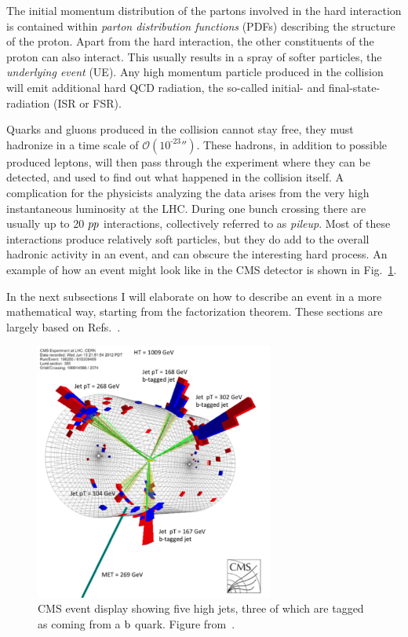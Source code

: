The initial momentum distribution of the partons involved in the hard interaction is contained
within \textit{parton distribution functions} (PDFs) describing the structure of the proton. 
Apart from the hard interaction, the other constituents of the proton can also interact. This
usually results in a spray of softer particles, the \textit{underlying event} (UE). 
Any high momentum particle produced in the collision will emit additional hard QCD radiation, the
so-called initial- and final-state-radiation (ISR or FSR).

Quarks and gluons produced in the collision cannot stay free, they must hadronize in a time scale
of $\mathcal{O}(\text{10}^{\text{-23}}\second)$. These hadrons, in addition to possible produced
leptons, will then pass through the experiment where they can be detected, and used to find out
what happened in the collision itself. 
A complication for the physicists analyzing the data arises from the very high
instantaneous luminosity at the LHC. During one bunch crossing there are usually up to 20
${p}{p}$ interactions, collectively referred to as \textit{pileup}. Most of these interactions
produce relatively soft particles, but they do add to the overall hadronic activity in an event,
and can obscure the interesting hard process. 
An example of how an event might look like in the CMS detector is shown in
Fig.~\ref{fig:event_display}. 

In the next subsections I will elaborate on how to describe an event in a more mathematical way,
starting from the factorization theorem. These sections are largely based on
Refs.~\cite{Campbell:2006wx,Skands:2011pf,Salam_Bautzen,Salam:2010zt,Tung:2001cv}.

\begin{figure}[htpb]
  \centering
  \includegraphics[width=0.7\textwidth]{figures/eventreco_event/event_display_SUS12024}
  \caption{CMS event display showing five high \pt jets, three of which are tagged as coming from a
$\mathrm{b}$ quark. Figure from~\cite{SUS12024_event_display}.
  \label{fig:event_display}}
\end{figure}


